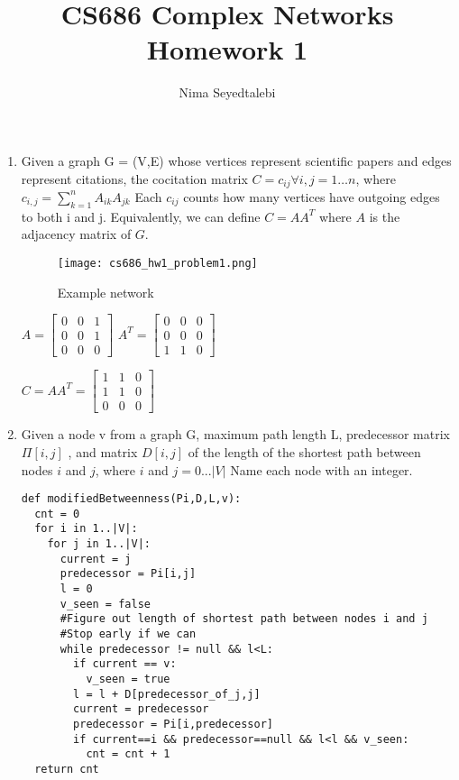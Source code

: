 \documentclass[]{article}
\title{CS686 Complex Networks Homework 1}
\author{Nima Seyedtalebi}
\begin{document}
\maketitle


\begin{enumerate}
	\item Given a graph G = (V,E) whose vertices represent scientific papers and edges represent citations, the cocitation matrix $C = c_{ij} \forall {i,j} = 1\dots n$, where $c_{i,j} = \sum_{k=1}^{n} A_{ik}A_{jk}$ Each $c_{ij}$ counts how many vertices have outgoing edges to both i and j. Equivalently, we can define $C = AA^T$ where $A$ is the adjacency matrix of $G$. 
	\begin{figure}[h!]
		\texttt{[image: cs686\_hw1\_problem1.png]}
		\caption{Example network}
		\label{fig:prob1}
	\end{figure}


	$A =  \begin{bmatrix}0&0&1\\
	0&0&1\\
	0&0&0
	\end{bmatrix}$ 	$A^T =  \begin{bmatrix}0&0&0\\
	0&0&0\\
	1&1&0
	\end{bmatrix}$
	
	$C=AA^T=\begin{bmatrix}
	1&1&0\\
	1&1&0\\
	0&0&0
	\end{bmatrix}$
	
	\item  Given a node v from a graph G, maximum path length L, predecessor matrix $\Pi[i,j]$ , and matrix $D[i,j]$ of the length of the shortest path between nodes $i$ and $j$, where $i$ and $j = 0...|V|$
	Name each node with an integer.
	
	\begin{verbatim}
def modifiedBetweenness(Pi,D,L,v):
  cnt = 0
  for i in 1..|V|:
    for j in 1..|V|:
      current = j
      predecessor = Pi[i,j]
      l = 0
      v_seen = false
      #Figure out length of shortest path between nodes i and j
      #Stop early if we can
      while predecessor != null && l<L:
        if current == v:
          v_seen = true
        l = l + D[predecessor_of_j,j]
        current = predecessor
        predecessor = Pi[i,predecessor]
        if current==i && predecessor==null && l<l && v_seen:
          cnt = cnt + 1
  return cnt
	

\end{verbatim}
\end{enumerate}
\end{document}
